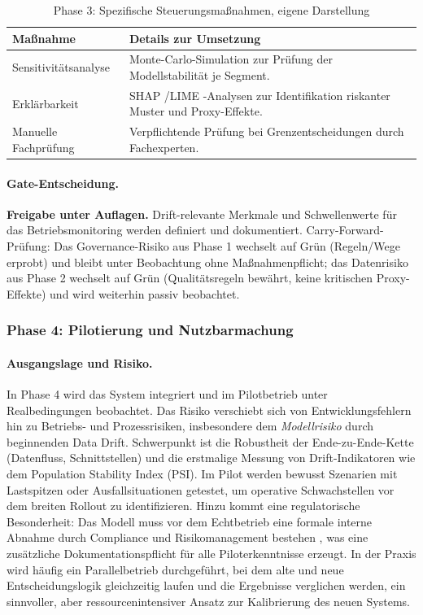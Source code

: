\begin{table}[!htbp]
\centering
\begin{tabular}{|p{4cm}|p{8cm}|}
\hline
\textbf{Maßnahme} & \textbf{Details zur Umsetzung} \\
\hline
Sensitivitätsanalyse & Monte-Carlo-Simulation zur Prüfung der Modellstabilität je Segment. \\
Erklärbarkeit & SHAP \cite{lundberg_unified_2017}/LIME \cite{ribeiro_why_2016}-Analysen zur Identifikation riskanter Muster und Proxy-Effekte. \\
Manuelle Fachprüfung & Verpflichtende Prüfung bei Grenzentscheidungen durch Fachexperten. \\
\hline
\end{tabular}
\caption{Phase 3: Spezifische Steuerungsmaßnahmen, eigene Darstellung}
\label{tab:cs1_phase3_massnahmen}
\end{table}

\paragraph*{Gate-Entscheidung.}
\textbf{Freigabe unter Auflagen.} Drift-relevante Merkmale und Schwellenwerte für das
Betriebsmonitoring werden definiert und dokumentiert.
Carry-Forward-Prüfung: Das Governance-Risiko aus Phase 1 wechselt auf Grün (Regeln/Wege erprobt)
und bleibt unter Beobachtung ohne Maßnahmenpflicht;
das Datenrisiko aus Phase 2 wechselt auf Grün (Qualitätsregeln bewährt, keine kritischen Proxy-Effekte)
und wird weiterhin passiv beobachtet.

\subsubsection{Phase 4: Pilotierung und Nutzbarmachung}
\paragraph*{Ausgangslage und Risiko.}
In Phase 4 wird das System integriert und im Pilotbetrieb unter Realbedingungen beobachtet.
Das Risiko verschiebt sich von Entwicklungsfehlern hin zu Betriebs- und Prozessrisiken,
insbesondere dem \textit{Modellrisiko} durch beginnenden Data Drift.
Schwerpunkt ist die Robustheit der Ende-zu-Ende-Kette (Datenfluss, Schnittstellen)
und die erstmalige Messung von Drift-Indikatoren wie dem Population Stability Index (PSI).
Im Pilot werden bewusst Szenarien mit Lastspitzen oder Ausfallsituationen getestet,
um operative Schwachstellen vor dem breiten Rollout zu identifizieren.
Hinzu kommt eine regulatorische Besonderheit: Das Modell muss vor dem Echtbetrieb
eine formale interne Abnahme durch Compliance und Risikomanagement bestehen \cite{EUAIAct2024},
was eine zusätzliche Dokumentationspflicht für alle Piloterkenntnisse erzeugt.
In der Praxis wird häufig ein Parallelbetrieb durchgeführt, bei dem alte und neue
Entscheidungslogik gleichzeitig laufen und die Ergebnisse verglichen werden,
ein sinnvoller, aber ressourcenintensiver Ansatz zur Kalibrierung des neuen Systems.

